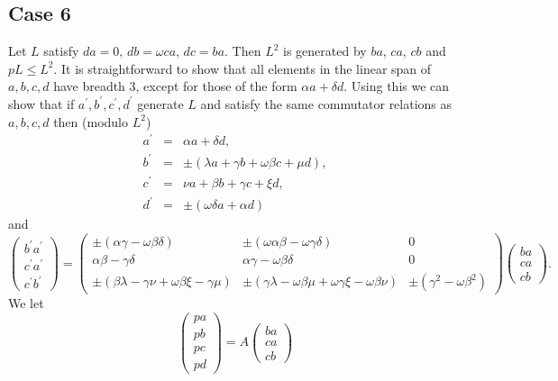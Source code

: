 \documentclass[10pt]{article}
\begin{document}
\subsection{Case 6}

Let $L$ satisfy $da=0,\,db=\omega ca,\,dc=ba$. Then $L^{2}$ is generated by $%
ba$, $ca$, $cb$ and $pL\leq L^{2}$. It is straightforward to show that all
elements in the linear span of $a,b,c,d$ have breadth 3, except for those of
the form $\alpha a+\delta d$. Using this we can show that if $a^{\prime
},b^{\prime },c^{\prime },d^{\prime }$ generate $L$ and satisfy the same
commutator relations as $a,b,c,d$ then (modulo $L^{2}$) 
\begin{eqnarray*}
a^{\prime } &=&\alpha a+\delta d, \\
b^{\prime } &=&\pm (\lambda a+\gamma b+\omega \beta c+\mu d), \\
c^{\prime } &=&\nu a+\beta b+\gamma c+\xi d, \\
d^{\prime } &=&\pm (\omega \delta a+\alpha d)
\end{eqnarray*}%
and 
\[
\left( 
\begin{array}{c}
b^{\prime }a^{\prime } \\ 
c^{\prime }a^{\prime } \\ 
c^{\prime }b^{\prime }%
\end{array}%
\right) =\left( 
\begin{array}{ccc}
\pm (\alpha \gamma -\omega \beta \delta ) & \pm (\omega \alpha \beta -\omega
\gamma \delta ) & 0 \\ 
\alpha \beta -\gamma \delta & \alpha \gamma -\omega \beta \delta & 0 \\ 
\pm (\beta \lambda -\gamma \nu +\omega \beta \xi -\gamma \mu ) & \pm (\gamma
\lambda -\omega \beta \mu +\omega \gamma \xi -\omega \beta \nu ) & \pm
(\gamma ^{2}-\omega \beta ^{2})%
\end{array}%
\right) \left( 
\begin{array}{c}
ba \\ 
ca \\ 
cb%
\end{array}%
\right) . 
\]%
We let 
\[
\left( 
\begin{array}{c}
pa \\ 
pb \\ 
pc \\ 
pd%
\end{array}%
\right) =A\left( 
\begin{array}{c}
ba \\ 
ca \\ 
cb%
\end{array}%
\right) 
\]%
\end{document}
